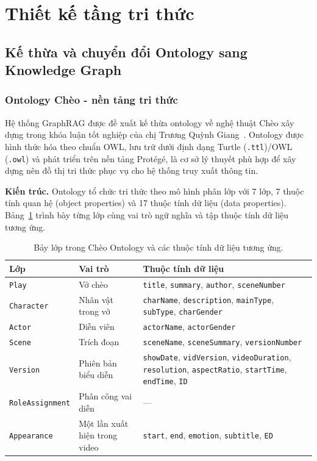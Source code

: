 \section{Thiết kế tầng tri thức}

\subsection{Kế thừa và chuyển đổi Ontology sang Knowledge Graph}

\subsubsection{Ontology Chèo - nền tảng tri thức}

Hệ thống GraphRAG được đề xuất kế thừa ontology về nghệ thuật Chèo xây dựng trong khóa luận tốt nghiệp của chị Trương Quỳnh Giang~\cite{Giang2025}. Ontology được hình thức hóa theo chuẩn OWL, lưu trữ dưới định dạng Turtle (\texttt{.ttl})/OWL (\texttt{.owl}) và phát triển trên nền tảng Protégé, là cơ sở lý thuyết phù hợp để xây dựng nên đồ thị tri thức phục vụ cho hệ thống truy xuất thông tin.

\textbf{Kiến trúc.}
Ontology tổ chức tri thức theo mô hình phân lớp với 7 lớp, 7 thuộc tính quan hệ (object properties) và 17 thuộc tính dữ liệu (data properties). Bảng~\ref{tab:ontology_classes} trình bày từng lớp cùng vai trò ngữ nghĩa và tập thuộc tính dữ liệu tương ứng.

\begin{table}[ht]
  \centering
  \caption{Bảy lớp trong Chèo Ontology và các thuộc tính dữ liệu tương ứng.}
  \label{tab:ontology_classes}
  \renewcommand{\arraystretch}{1.35}
  \small
  \begin{tabular}{p{3.5cm} p{3.3cm} p{7.99cm}}
    \toprule
    \textbf{Lớp} & \textbf{Vai trò} & \textbf{Thuộc tính dữ liệu} \\
    \midrule
    \texttt{Play}
      & Vở chèo
      & \texttt{title}, \texttt{summary}, \texttt{author}, \texttt{sceneNumber} \\[2pt]
    \texttt{Character}
      & Nhân vật trong vở
      & \texttt{charName}, \texttt{description}, \texttt{mainType}, \texttt{subType}, \texttt{charGender} \\[2pt]
    \texttt{Actor}
      & Diễn viên
      & \texttt{actorName}, \texttt{actorGender} \\[2pt]
    \texttt{Scene}
      & Trích đoạn
      & \texttt{sceneName}, \texttt{sceneSummary}, \texttt{versionNumber} \\[2pt]
    \texttt{Version}
      & Phiên bản biểu diễn
      & \texttt{showDate}, \texttt{vidVersion}, \texttt{videoDuration}, \texttt{resolution},
        \texttt{aspectRatio}, \texttt{startTime}, \texttt{endTime}, \texttt{ID} \\[2pt]
    \texttt{RoleAssignment}
      &  Phân công vai diễn
      & --- \\[2pt]
    \texttt{Appearance}
      & Một lần xuất hiện trong video
      & \texttt{start}, \texttt{end}, \texttt{emotion}, \texttt{subtitle}, \texttt{ED} \\
    \bottomrule
  \end{tabular}
\end{table}

